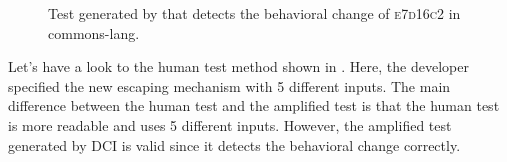 \begin{figure}[h]
\centering
{}
\caption{Test generated by \DCII that detects the behavioral change of \textsc{e7d16c2} in commons-lang.}
\label{fig:ampl_commons-lang}
\end{figure}

Let's have a look to the human test method shown in .
Here, the developer specified the new escaping mechanism with 5 different inputs.
%
The main difference between the human test and the amplified test is that the human test is more readable and uses 5 different inputs.
However, the amplified test generated by DCI is valid since it detects the behavioral change correctly.

